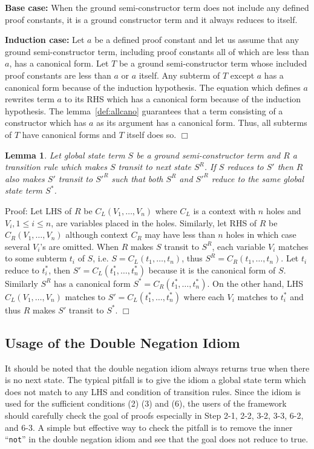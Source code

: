 \documentclass[12pt]{report}
\newtheorem{lemma}{Lemma}
\newcommand{\stt}[1]{{\small{\tt {#1}}}}
\begin{document}
\begin{description}
\setlength{\parskip}{0cm}
\setlength{\itemsep}{0cm}
\item {\bf Base case:} When the ground semi-constructor term does not
  include any defined proof constants, it is a ground constructor term
  and it always reduces to itself.
\item {\bf Induction case:} Let $a$ be a defined proof constant and
  let us assume that any ground semi-constructor term, including proof
  constants all of which are less than $a$, has a canonical form. Let
  $T$ be a ground semi-constructor term whose included proof constants
  are less than $a$ or $a$ itself. Any subterm of $T$ except $a$ has a
  canonical form because of the induction hypothesis. The equation
  which defines $a$ rewrites term $a$ to its RHS which has a canonical
  form because of the induction hypothesis. The
  lemma~\ref{def:allcano} guarantees that a term consisting of a
  constructor which has $a$ as its argument has a canonical form.
  Thus, all subterms of $T$ have canonical forms and $T$ itself does so.
  $\Box$
\end{description}
\begin{lemma}
  Let global state term $S$ be a ground semi-constructor term and $R$ a
  transition rule which makes $S$ transit to next state $S^R$. If $S$
  reduces to $S'$ then $R$ also makes $S'$ transit to $S'^R$ such
  that both $S^R$ and $S'^R$ reduce to the same global state term
  $S^*$.
\end{lemma}
Proof: Let LHS of $R$ be $C_L(V_1,\dots,V_n)$ where $C_L$ is a context
with $n$ holes and $V_i, 1\le i\le n$, are variables placed in the
holes.  Similarly, let RHS of $R$ be $C_R(V_1,\dots,V_n)$ although
context $C_R$ may have less than $n$ holes in which case several
$V_i$'s are omitted. When $R$ makes $S$ transit to $S^R$, each
variable $V_i$ matches to some subterm $t_i$ of $S$\!,
i.e. $S=C_L(t_1,\dots,t_n)$, thus $S^R=C_R(t_1,\dots,t_n)$. Let $t_i$
reduce to $t^*_i$, then $S'=C_L(t^*_1,\dots,t^*_n)$ because it is the
canonical form of $S$\!.  Similarly $S^R$ has a canonical form
$S^*=C_R(t^*_1,\dots,t^*_n)$.  On the other hand, LHS
$C_L(V_1,\dots,V_n)$ matches to $S'=C_L(t^*_1,\dots,t^*_n)$ where each
$V_i$ matches to $t^*_i$ and thus $R$ makes $S'$ transit to
$S^*$. $\Box$

\subsection{Usage of the Double Negation Idiom}
It should be noted that the double negation idiom always returns true
when there is no next state. The typical pitfall is to give the idiom
a global state term which does not match to any LHS and condition of
transition rules. Since the idiom is used for the sufficient
conditions (2) (3) and (6), the users of the framework should
carefully check the goal of proofs especially in Step 2-1, 2-2, 3-2,
3-3, 6-2, and 6-3. A simple but effective way to check the pitfall is
to remove the inner ``\stt{not}'' in the double negation idiom and see
that the goal does not reduce to true.
\end{document}
